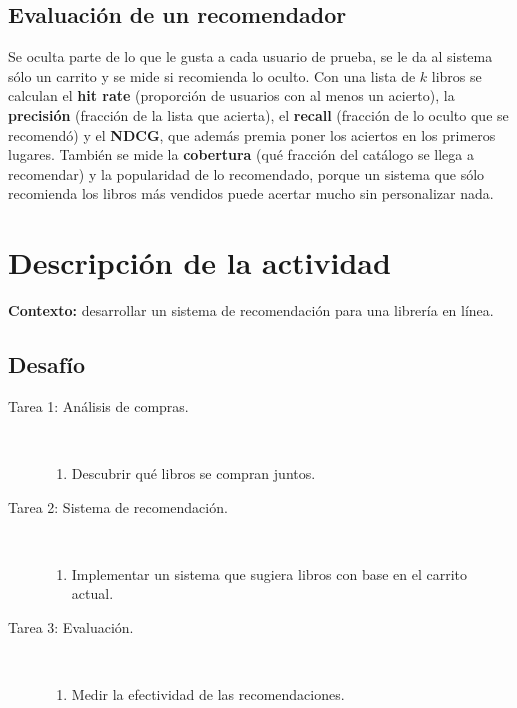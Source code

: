 \documentclass[11pt,letterpaper]{article}
\begin{document}
\subsection{Evaluación de un recomendador}

Se oculta parte de lo que le gusta a cada usuario de prueba, se le da al sistema sólo un carrito y se mide si recomienda lo oculto. Con una lista de $k$ libros se calculan el \textbf{hit rate} (proporción de usuarios con al menos un acierto), la \textbf{precisión} (fracción de la lista que acierta), el \textbf{recall} (fracción de lo oculto que se recomendó) y el \textbf{NDCG}, que además premia poner los aciertos en los primeros lugares. También se mide la \textbf{cobertura} (qué fracción del catálogo se llega a recomendar) y la popularidad de lo recomendado, porque un sistema que sólo recomienda los libros más vendidos puede acertar mucho sin personalizar nada.

\section{Descripción de la actividad}

\textbf{Contexto:} desarrollar un sistema de recomendación para una librería en línea.

\subsection*{Desafío}

\begin{description}
    \item[Tarea 1: Análisis de compras.]\mbox{}\\[-1.3\baselineskip]
    \begin{enumerate}
        \item Descubrir qué libros se compran juntos.
    \end{enumerate}
    \item[Tarea 2: Sistema de recomendación.]\mbox{}\\[-1.3\baselineskip]
    \begin{enumerate}
        \item Implementar un sistema que sugiera libros con base en el carrito actual.
    \end{enumerate}
    \item[Tarea 3: Evaluación.]\mbox{}\\[-1.3\baselineskip]
    \begin{enumerate}
        \item Medir la efectividad de las recomendaciones.
    \end{enumerate}
\end{description}
\end{document}

